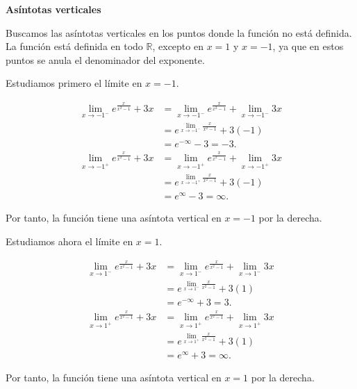 \documentclass[
  spanish,
  a4paper,
]{scrreport}
\theoremstyle{definition}
\theoremstyle{remark}
\begin{document}
\begin{tcolorbox}[enhanced jigsaw, arc=.35mm, bottomrule=.15mm, bottomtitle=1mm, breakable, colback=white, colbacktitle=quarto-callout-tip-color!10!white, colframe=quarto-callout-tip-color-frame, coltitle=black, left=2mm, leftrule=.75mm, opacityback=0, opacitybacktitle=0.6, rightrule=.15mm, title=\textcolor{quarto-callout-tip-color}{\faLightbulb}\hspace{0.5em}{Solución}, titlerule=0mm, toprule=.15mm, toptitle=1mm]

\textbf{Asíntotas verticales}

Buscamos las asíntotas verticales en los puntos donde la función no está
definida. La función está definida en todo \(\mathbb{R}\), excepto en
\(x=1\) y \(x=-1\), ya que en estos puntos se anula el denominador del
exponente.

Estudiamos primero el límite en \(x=-1\).

\begin{align*}
\lim_{x\to -1^-} e^{\frac{x}{x^2-1}}+3x 
&= \lim_{x\to -1^-} e^{\frac{x}{x^2-1}}+\lim_{x\to -1^-} 3x \\
&= e^{\lim_{x\to -1^-}\frac{x}{x^2-1}}+3(-1) \\
&= e^{-\infty}-3 = -3.\\
\lim_{x\to -1^+} e^{\frac{x}{x^2-1}}+3x
&= \lim_{x\to -1^+} e^{\frac{x}{x^2-1}}+\lim_{x\to -1^+} 3x \\
&= e^{\lim_{x\to -1^+}\frac{x}{x^2-1}}+3(-1) \\
&= e^{\infty}-3 = \infty.
\end{align*}

Por tanto, la función tiene una asíntota vertical en \(x=-1\) por la
derecha.

Estudiamos ahora el límite en \(x=1\).

\begin{align*}
\lim_{x\to 1^-} e^{\frac{x}{x^2-1}}+3x
&= \lim_{x\to 1^-} e^{\frac{x}{x^2-1}}+\lim_{x\to 1^-} 3x \\
&= e^{\lim_{x\to 1^-}\frac{x}{x^2-1}}+3(1) \\
&= e^{-\infty}+3 = 3.\\
\lim_{x\to 1^+} e^{\frac{x}{x^2-1}}+3x
&= \lim_{x\to 1^+} e^{\frac{x}{x^2-1}}+\lim_{x\to 1^+} 3x \\
&= e^{\lim_{x\to 1^+}\frac{x}{x^2-1}}+3(1) \\
&= e^{\infty}+3 = \infty.
\end{align*}

Por tanto, la función tiene una asíntota vertical en \(x=1\) por la
derecha.


\end{tcolorbox}
\end{document}
